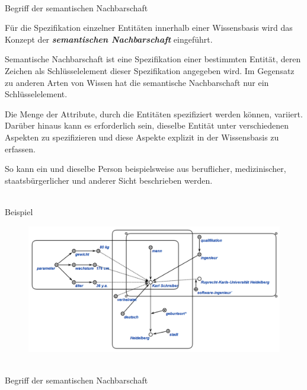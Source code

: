 \begin{frame}{\\Begriff der semantischen Nachbarschaft}
	\topline
	\justifying
	
	\vspace{5mm}
	Für die Spezifikation einzelner Entitäten innerhalb einer Wissensbasis wird das Konzept der \textit{\textbf{semantischen Nachbarschaft}} eingeführt.
	
	Semantische Nachbarschaft ist eine Spezifikation einer bestimmten Entität, deren Zeichen als Schlüsselelement dieser Spezifikation angegeben wird. Im Gegensatz zu anderen Arten von Wissen hat die semantische Nachbarschaft nur ein Schlüsselelement.
	
	Die Menge der Attribute, durch die Entitäten spezifiziert werden können, variiert. Darüber hinaus kann es erforderlich sein, dieselbe Entität unter verschiedenen Aspekten zu spezifizieren und diese Aspekte explizit in der Wissensbasis zu erfassen.
	
	So kann ein und dieselbe Person beispielsweise aus beruflicher, medizinischer, staatsbürgerlicher und anderer Sicht beschrieben werden.
\end{frame}

\begin{frame}{\\Beispiel}
	\topline
	\justifying
	\vspace{10mm}
	
	\begin{figure}[H]
		\includegraphics[scale=0.5]{./figures/sd_structures/example_de.png}
	\end{figure}
\end{frame}

\begin{frame}{\\Begriff der semantischen Nachbarschaft}
	\topline
	\justifying
	
	\begin{SCn}
	\end{SCn}

\end{frame}

